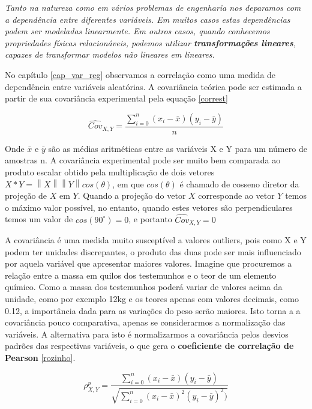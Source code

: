   \begin{remark}
  	\textit{Tanto na natureza como em vários problemas de engenharia nos deparamos com a dependência entre diferentes variáveis. Em muitos casos estas dependências podem ser modeladas linearmente. Em outros casos, quando conhecemos propriedades físicas relacionáveis, podemos utilizar \textbf{transformações lineares}, capazes de transformar modelos não lineares em lineares.} 
  \end{remark}

No capítulo \ref{cap_var_reg} observamos a correlação como uma medida de dependência entre variáveis aleatórias. A covariância teórica pode ser estimada a partir de sua covariância experimental pela equação \eqref{correst} 

\begin{equation}\label{correst}
\hat{Cov}_{X,Y} = \frac{\sum_{i=0}^{n} (x_{i} - \bar{x})(y_{i} - \bar{y})}{n}
\end{equation}

Onde $\bar{x}$ e $\bar{y}$ são as médias aritméticas entre as variáveis X e Y para um número de amostras n. A covariância experimental pode ser muito bem comparada ao produto escalar obtido pela multiplicação de dois vetores $X*Y = \left \| X\right \| \left \| Y  \right \| cos(\theta)$, em que $cos(\theta)$ é chamado de cosseno diretor da projeção de $X$ em $Y$. Quando a projeção do vetor $X$ corresponde ao vetor $Y$ temos o máximo valor possível, no entanto, quando estes vetores são perpendiculares temos um valor de $cos(90^{\circ})=0$, e portanto $\hat{Cov}_{X,Y} =0$  

A covariância é uma medida muito susceptível a valores outliers, pois como X e Y podem ter unidades discrepantes, o produto das duas pode ser mais influenciado por aquela variável que apresentar maiores valores. Imagine que procuremos a relação entre a massa em quilos dos testemunhos e o teor de um elemento químico. Como a massa dos testemunhos poderá variar de valores acima da unidade, como por exemplo 12kg e os teores apenas com valores decimais, como 0.12, a importância dada para as variações do peso serão maiores. Isto torna a a covariância pouco comparativa, apenas se considerarmos a normalização das variáveis. A alternativa para isto é normalizarmos a covariância pelos desvios padrões das respectivas variáveis, o que gera o \textbf{coeficiente de correlação de Pearson} \eqref{rozinho}.   


\begin{equation}\label{rozinho}
\rho_{X,Y}^{p} = \frac{\sum_{i=0}^{n} (x_{i} - \bar{x})(y_{i} - \bar{y})}{\sqrt{\sum_{i=0}^{n}(x_{i} - \bar{x})^{2}(y_{i} - \bar{y})^{2})}} 
\end{equation}
 
